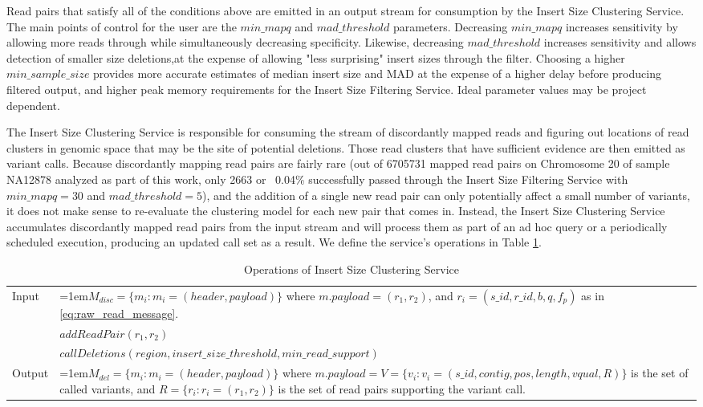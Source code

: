Read pairs that satisfy all of the conditions above are emitted in an output stream for consumption by the Insert Size Clustering Service. The main points of control for the user are the $min\_mapq$ and $mad\_threshold$ parameters. Decreasing $min\_mapq$ increases sensitivity by allowing more reads through while simultaneously decreasing specificity. Likewise, decreasing $mad\_threshold$ increases sensitivity and allows detection of smaller size deletions,at the expense of allowing "less surprising" insert sizes through the filter. Choosing a higher $min\_sample\_size$ provides more accurate estimates of median insert size and MAD at the expense of a higher delay before producing filtered output, and higher peak memory requirements for the Insert Size Filtering Service. Ideal parameter values may be project dependent.

The Insert Size Clustering Service is responsible for consuming the stream of discordantly mapped reads and figuring out locations of read clusters in genomic space that may be the site of potential deletions. Those read clusters that have sufficient evidence are then emitted as variant calls. Because discordantly mapping read pairs are fairly rare (out of 6705731 mapped read pairs on Chromosome 20 of sample NA12878 analyzed as part of this work, only 2663 or ~0.04\% successfully passed through the Insert Size Filtering Service with $min\_mapq=30$ and $mad\_threshold=5$), and the addition of a single new read pair can only potentially affect a small number of variants, it does not make sense to re-evaluate the clustering model for each new pair that comes in. Instead, the Insert Size Clustering Service accumulates discordantly mapped read pairs from the input stream and will process them as part of an ad hoc query or a periodically scheduled execution, producing an updated call set as a result. We define the service's operations in Table \ref{tab:op_insert_size_clustering}.

\bgroup
\def\arraystretch{1.5}
\begin{table}[!h]
    \caption{Operations of Insert Size Clustering Service}
    \label{tab:op_insert_size_clustering}
    {\begin{tabular}{l|p{12cm}}
    \toprule
    \multirow{2}{*}{Input} & \hangindent=1em$M_{disc} = \{m_i: m_i = (header, payload)\}$ where $m.payload = (r_1,r_2)$, and $r_i = (s\_id, r\_id, b, q, f_p)$ as in \ref{eq:raw_read_message}. \\
    \cline{2-2}
    \multirow{2}{*}{Operations} & $addReadPair(r_1,r_2)$\\
    & $callDeletions(region, insert\_size\_threshold, min\_read\_support)$\\
    \cline{2-2}
    \multirow{2}{*}{Output} & \hangindent=1em$M_{del} = \{m_i: m_i = (header, payload)\}$ where $m.payload = V = \{v_i: v_i = (s\_id, contig, pos, length, vqual, R)\}$ is the set of called variants, and $R = \{r_i: r_i = (r_1,r_2)\}$ is the set of read pairs supporting the variant call.\\ 
    \bottomrule
    \end{tabular}}
\end{table}
\egroup

